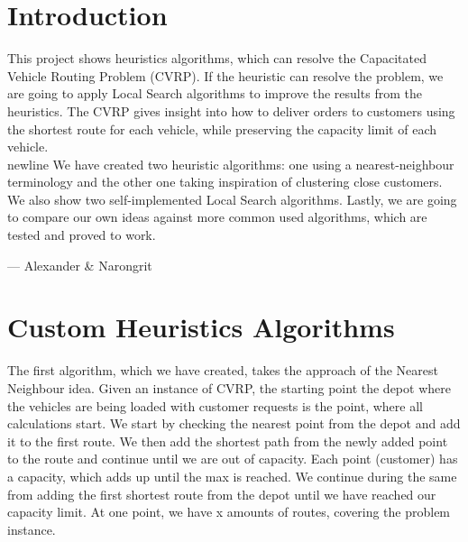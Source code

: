 \documentclass[12pt]{article}
\begin{document}

\tableofcontents
\pagebreak


\section{Introduction}

This project shows heuristics algorithms, which can resolve the Capacitated Vehicle Routing Problem (CVRP). If the heuristic can resolve the problem, we are going to apply Local Search algorithms to improve the results from the heuristics. 
The CVRP gives insight into how to deliver orders to customers using the shortest route for each vehicle, while preserving the capacity limit of each vehicle.\\newline
We have created two heuristic algorithms: one using a nearest-neighbour terminology and the other one taking inspiration of clustering close customers. We also show two self-implemented Local Search algorithms. 
Lastly, we are going to compare our own ideas against more common used algorithms, which are tested and proved to work. 

\hspace{1 cm}--- Alexander \& Narongrit

\newpage

\section{Custom Heuristics Algorithms}


The first algorithm, which we have created, takes the approach of the Nearest Neighbour idea. Given an instance of CVRP, the starting point \- the depot where the vehicles are being loaded with customer requests \- is the point, where all calculations start. 
We start by checking the nearest point from the depot and add it to the first route. We then add the shortest path from the newly added point to the route and continue until we are out of capacity. Each point (customer) has a capacity, which adds up until the max is reached. We continue during the same from adding the first shortest route from the depot until we have reached our capacity limit. At one point, we have x amounts of routes, covering the problem instance. 
\newline
\end{document}

